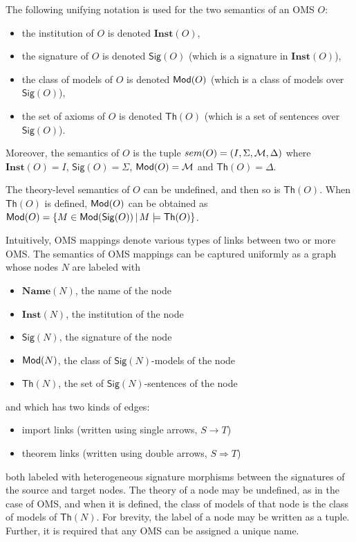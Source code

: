 \documentclass[10pt,fleqn,final]{scrreprt}
\newcommand{\cbs}[0]{\color{red}\xspace} %
\newcommand{\cbe}[0]{\color{black}\xspace} %
\newcommand{\Sig}{\mathsf{Sig}}
\renewcommand{\Th}{\mathsf{Th}}
\newcommand{\Inst}{\ensuremath{\mathbf{Inst}}}
\newcommand{\Name}{\ensuremath{\mathbf{Name}}}
\newenvironment{definitions}[0]{\medskip }{}
\begin{document}
\begin{definitions}
\cbs The following unifying notation is used\cbe for the two semantics of an OMS $O$:\begin{itemize}
 \item the institution of $O$ is denoted $\Inst(O)$,
  \item the signature of $O$ is denoted $\Sig(O)$ (which is a signature in $\Inst(O)$),
  \item the class of models of $O$ is denoted $\mathsf{Mod}(O)$ (which is a class of models over $\Sig(O)$),
  \item the set of axioms of $O$ is denoted $\Th(O)$ (which is a set of sentences over $\Sig(O)$).
\end{itemize}
\noindent Moreover,\cbs the semantics of $O$ is the tuple $sem(O) = (I, \Sigma, {\cal M},\Delta)$
where $\Inst(O) = I$, $\Sig(O) = \Sigma$, $\mathsf{Mod}(O) = {\cal M}$ and $\Th(O) = \Delta$.\cbe

The theory-level semantics of $O$ can be undefined, and then so is $\Th(O)$. When $\Th(O)$ is defined, $\mathsf{Mod}(O)$ can be obtained as $\Mod(O)=\{M\in\Mod(\Sig(O)) \,|\, M\models\Th(O)\}$.

Intuitively, OMS mappings denote various types of links between two or more OMS. 
The semantics of OMS mappings can be captured uniformly as a graph whose nodes $N$ are labeled with 
\begin{itemize}
 \item $\Name(N)$, the name of the node
 \item $\Inst(N)$, the institution of the node
 \item $\Sig(N)$, the signature of the node
 \item $\mathsf{Mod}(N)$, the class of $\Sig(N)$-models of the node
 \item $\Th(N)$, the set of $\Sig(N)$-sentences of the node
\end{itemize}
and 
which has two kinds of edges:
\begin{itemize}
  \item import links (written using single arrows, $S\rightarrow T$)
  \item theorem links (written using double arrows, $S\Rightarrow T$)
\end{itemize}
both labeled with 
heterogeneous signature morphisms between the signatures of the source and target nodes.
The theory of a node  may be undefined, as in the case of OMS, and when it is defined, 
the class of models of that node is the class of models of $\Th(N)$. 
For brevity,\cbs  the label of a node may be written as a tuple. Further, it is required that  any OMS can be assigned a unique name.\cbe 


\end{definitions}
\end{document}
